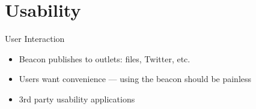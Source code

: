 \section{Usability}

\begin{frame}[t]{User Interaction}
    \begin{itemize}
        \item Beacon publishes to outlets: files, Twitter, etc.
        \item Users want convenience --- using the beacon should be painless
        \item 3rd party usability applications
    \end{itemize}
\end{frame}

